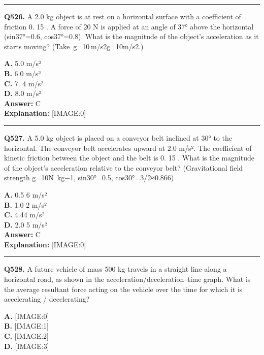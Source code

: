 \documentclass[12pt]{article}
\begin{document}
\hrule
\vspace{1em}


\noindent
\textbf{Q526.} A 2.0 kg object is at rest on a horizontal surface with a coefficient of friction 0.
15
. A force of 20 N is applied at an angle of 37° above the horizontal (sin37°=0.6, cos37°=0.8). What is the magnitude of the object’s acceleration as it starts moving? (Take g=10 m/s2g=10m/s2.)



\textbf{A.} 5.0 m/s² \\
\textbf{B.} 6.0 m/s² \\
\textbf{C.} 7.
4
m/s² \\
\textbf{D.} 8.0 m/s² \\

\textbf{Answer:} C \\
\textbf{Explanation:} [IMAGE:0]

\hrule
\vspace{1em}


\noindent
\textbf{Q527.} A 5.0 kg object is placed on a conveyor belt inclined at 30° to the horizontal. The conveyor belt accelerates upward at 2.0 m/s². The coefficient of kinetic friction between the object and the belt is 0.
15
. What is the magnitude of the object's acceleration relative to the conveyor belt? (Gravitational field strength g=10N kg−1, sin30°=0.5, cos30°=3​/2≈0.866)



\textbf{A.} 0.5
6
m/s² \\
\textbf{B.} 1.0
2
m/s² \\
\textbf{C.} 4.44
m/s² \\
\textbf{D.} 2.0
5
m/s² \\

\textbf{Answer:} C \\
\textbf{Explanation:} [IMAGE:0]

\hrule
\vspace{1em}


\noindent
\textbf{Q528.} A future vehicle of mass 500 kg travels in a straight line along a horizontal road, as shown in the acceleration/deceleration–time graph.
What is the average resultant force acting on the vehicle over the time for which it is accelerating / decelerating?



\textbf{A.} [IMAGE:0] \\
\textbf{B.} [IMAGE:1] \\
\textbf{C.} [IMAGE:2] \\
\textbf{D.} [IMAGE:3] \\
\end{document}
